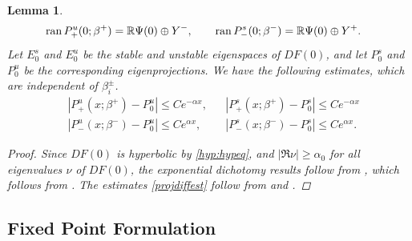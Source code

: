 \documentclass[12pt]{elsarticle}
\theoremstyle{plain}
\newtheorem{lemma}[theorem]{Lemma}
\theoremstyle{definition}
\theoremstyle{remark}
\numberwithin{theorem}{section}
\numberwithin{equation}{section}
\begin{document}
\begin{lemma}
\begin{align*}
\operatorname{ran} P^u_+(0; \beta^+) &= \mathbb{R} \Psi(0) \oplus Y^-, \qquad
\operatorname{ran} P^s_-(0; \beta^-) = \mathbb{R} \Psi(0) \oplus Y^+.
\end{align*}
Let $E_0^s$ and $E_0^u$ be the stable and unstable eigenspaces of $DF(0)$, and let $P_0^s$ and $P_0^u$ be the corresponding eigenprojections. We have the following estimates, which are independent of $\beta_i^\pm$.
\begin{equation}\label{projdiffest}
\begin{aligned}
&|P^u_+(x; \beta^+) - P_0^u| \leq C e^{-\alpha x},
&&|P^s_+(x; \beta^+) - P_0^s| \leq C e^{-\alpha x} \\
&|P^u_-(x; \beta^-) - P_0^u| \leq C e^{\alpha x},
&&|P^s_-(x; \beta^-) - P_0^s| \leq C e^{\alpha x} .
\end{aligned}
\end{equation}

\begin{proof}
Since $DF(0)$ is hyperbolic by \cref{hyp:hypeq}, and $|\Re \nu| \geq \alpha_0$ for all eigenvalues $\nu$ of $DF(0)$, the exponential dichotomy results follow from \cite[Lemma 5.1]{Sandstede1997}, which follows from \cite[Lemma 1.1]{Sandstede1993}. The estimates \cref{projdiffest} follow from \cite[Lemma 1.1]{Sandstede1993} and \cite[Lemma 2.1]{Sandstede1993}.
\end{proof}
\end{lemma}

\subsection{Fixed Point Formulation}
\end{document}
